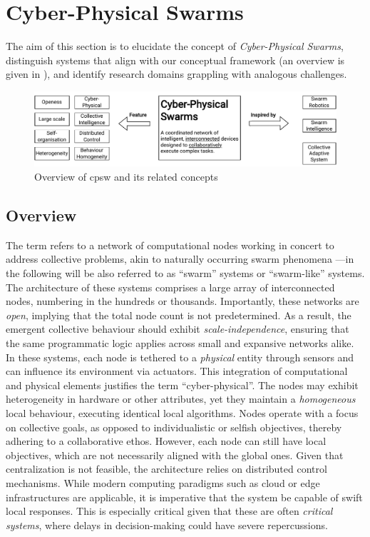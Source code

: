 \chapter{Cyber-Physical Swarms}\label{chap:cpsw}\mtcaddchapter
\minitoc%
The aim of this section is to elucidate the concept of \textit{Cyber-Physical Swarms}, 
 distinguish systems that align with our conceptual framework (an overview is given in ), 
 and identify research domains grappling with analogous challenges. 
% 
\begin{figure}
    \includegraphics[width=\textwidth]{chapters/img/cyber-physical-swarms-overview.drawio.pdf}
    \caption{Overview of \acf{cpsw} and its related concepts}\label{fig:overview-cpsw}
\end{figure}
\section{Overview}
The term refers to a network of computational nodes working in concert to address collective problems, 
 akin to naturally occurring swarm phenomena ---in the following will be also referred to as ``swarm'' systems or ``swarm-like'' systems.
%
The architecture of these systems comprises a large array of interconnected nodes, 
 numbering in the hundreds or thousands. 
% 
Importantly, these networks are \textit{open}, 
 implying that the total node count is not predetermined. 
% 
As a result, 
 the emergent collective behaviour should exhibit \textit{scale-independence}, 
 ensuring that the same programmatic logic applies across small and expansive networks alike.
%
In these systems, each node is tethered to a \textit{physical} entity through sensors and can influence its environment via actuators. 
 This integration of computational and physical elements justifies the term ``cyber-physical''. 
 The nodes may exhibit heterogeneity in hardware or other attributes, 
 yet they maintain a \emph{homogeneous} local behaviour, executing identical local algorithms.
%
Nodes operate with a focus on collective goals, 
 as opposed to individualistic or selfish objectives, 
 thereby adhering to a collaborative ethos.
%
However, each node can still have local objectives, 
 which are not necessarily aligned with the global ones.
% 
Given that centralization is not feasible, 
 the architecture relies on distributed control mechanisms. 
 While modern computing paradigms such as cloud or edge infrastructures are applicable, 
 it is imperative that the system be capable of swift local responses. 
 This is especially critical given that these are often \emph{critical systems}, 
 where delays in decision-making could have severe repercussions.


